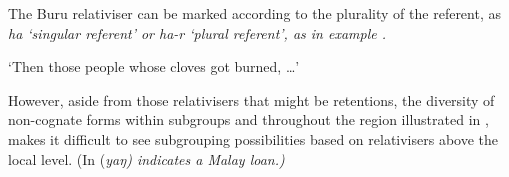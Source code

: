 The Buru relativiser can be marked according to the plurality
of the referent, as \it{ha} ‘singular referent’ or \it{ha-r} ‘plural referent’,
as in example .

\begin{exe}
			\glt	‘Then those people whose cloves got burned, {\ldots}’ 
						\label{ex:13-25}
\end{exe}

However, aside from those relativisers that might be retentions,
the diversity of non-cognate forms within subgroups
and throughout the region illustrated in ,
makes it difficult to see subgrouping possibilities based on
relativisers above the local level.
(In  (\it{yaŋ}) indicates a Malay loan.)


